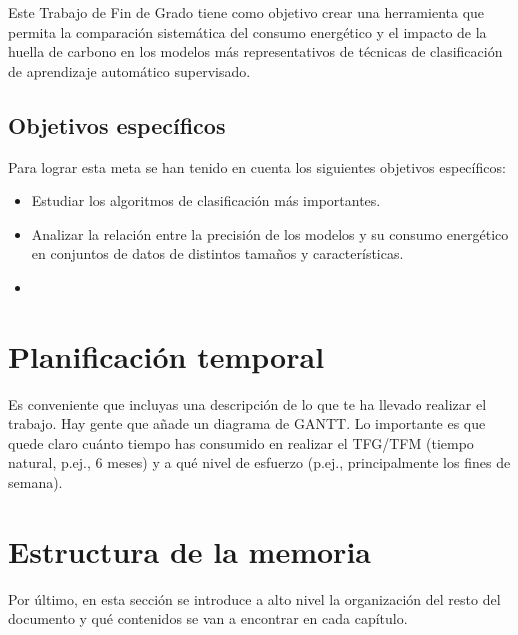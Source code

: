 Este Trabajo de Fin de Grado tiene como objetivo crear una herramienta que permita la comparación sistemática del consumo energético y el impacto de la huella de carbono en los modelos más representativos de técnicas de clasificación de aprendizaje automático supervisado.


\subsection{Objetivos específicos}
\label{sec:objetivos-especificos}

Para lograr esta meta se han tenido en cuenta los siguientes objetivos específicos:

    \begin{itemize}
        \item Estudiar los algoritmos de clasificación más importantes.
        \item Analizar la relación entre la precisión de los modelos y su consumo energético en conjuntos de datos de distintos tamaños y características.
        \item 
    \end{itemize}

\section{Planificación temporal}
\label{sec:planificacion-temporal}

Es conveniente que incluyas una descripción de lo que te ha llevado realizar el trabajo.
Hay gente que añade un diagrama de GANTT.
Lo importante es que quede claro cuánto tiempo has consumido en realizar el TFG/TFM 
(tiempo natural, p.ej., 6 meses) y a qué nivel de esfuerzo (p.ej., principalmente los 
fines de semana).

\section{Estructura de la memoria}
\label{sec:estructura}

Por último, en esta sección se introduce a alto nivel la organización del resto del documento
y qué contenidos se van a encontrar en cada capítulo.

